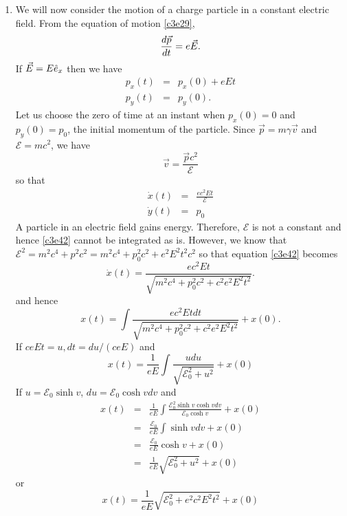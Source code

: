 \begin{enumerate}
\item We will now consider the motion of a charge particle in a constant electric
field. From the equation of motion \eqref{c3e29},
\begin{equation}\label{c3e38}
\frac{d{\vec{p}}}{d{t}} = e\vec{E}.
\end{equation}
If $\vec{E} = E\hat{e}_{x}$ then we have
\begin{eqnarray}
p_x(t) &=& p_x(0) + eEt \label{c3e39} \\
p_y(t) &=& p_y(0) \label{c3e40}.
\end{eqnarray}
Let us choose the zero of time at an instant when $p_x(0) = 0$ and $p_y(0) = p_0$,
the initial momentum of the particle. Since $\vec{p} = m\gamma\vec{v}$ and 
$\mathcal{E} = mc^2$, we have 
\begin{equation}\label{c3e41}
\vec{v} = \frac{\vec{p}c^2}{\mathcal{E}}
\end{equation}
so that
\begin{eqnarray}
\dot{x}(t) &=& \frac{ec^2Et}{\mathcal{E}} \label{c3e42} \\
\dot{y}(t) &=& p_0 \label{c3e43}
\end{eqnarray}
A particle in an electric field gains energy. Therefore, $\mathcal{E}$ is not a
constant and hence \eqref{c3e42} cannot be integrated as is. However, we know 
that $\mathcal{E}^2 = m^2c^4 + p^2c^2 = m^2c^4 + p_0^2c^2 + e^2E^2t^2c^2$ so that
equation \eqref{c3e42} becomes
\begin{equation}\label{c3e44}
\dot{x}(t) = \frac{ec^2Et}{\sqrt{m^2c^4 + p_0^2c^2 + c^2e^2E^2t^2}}.
\end{equation}
and hence
\[
x(t) = \int \frac{ec^2Et dt}{\sqrt{m^2c^4 + p_0^2c^2 + c^2e^2E^2t^2}} + x(0).
\]
If $ceEt = u, dt = du/(ceE)$ and
\[
x(t) = \frac{1}{eE}\int\frac{u du}{\sqrt{\mathcal{E}_0^2 + u^2}} + x(0)
\]
If $u = \mathcal{E}_0\sinh v$, $du = \mathcal{E}_0\cosh  vdv$ and
\begin{eqnarray*}
x(t) &=& \frac{1}{eE}\int\frac{\mathcal{E}_0^2\sinh v\cosh v dv}{\mathcal{E}_0\cosh v} + x(0) \\
 &=& \frac{\mathcal{E}_0}{eE}\int\sinh v dv + x(0) \\
 &=& \frac{\mathcal{E}_0}{eE}\cosh v + x(0) \\
 &=& \frac{1}{eE}\sqrt{\mathcal{E}_0^2 + u^2} + x(0)
\end{eqnarray*}
or
\begin{equation}\label{c3e45}
x(t) = \frac{1}{eE}\sqrt{\mathcal{E}_0^2 + e^2c^2E^2t^2} + x(0)
\end{equation}

\end{enumerate}

